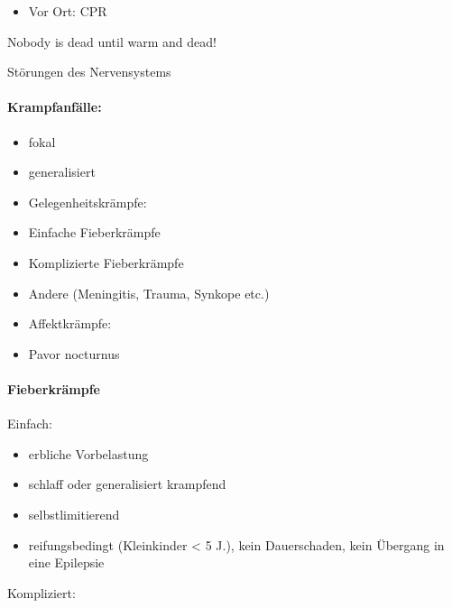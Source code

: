 \documentclass{article}
\begin{document}
\begin{itemize}
\item Vor Ort: CPR

\end{itemize}
Nobody is dead until warm and dead!

St\"orungen des Nervensystems

\paragraph{Krampfanf\"alle:}
\begin{itemize}
\item fokal

\item generalisiert

\item Gelegenheitskr\"ampfe:

\item Einfache Fieberkr\"ampfe

\item Komplizierte Fieberkr\"ampfe

\item Andere (Meningitis, Trauma, Synkope etc.)

\item Affektkr\"ampfe:

\item Pavor nocturnus

\end{itemize}
\paragraph{Fieberkr\"ampfe}
Einfach:

\begin{itemize}
\item erbliche Vorbelastung

\item schlaff oder generalisiert krampfend

\item selbstlimitierend

\item reifungsbedingt (Kleinkinder {\textless} 5 J.), kein 
Dauerschaden, kein  \"Ubergang in eine  Epilepsie

\end{itemize}
Kompliziert:
\end{document}
